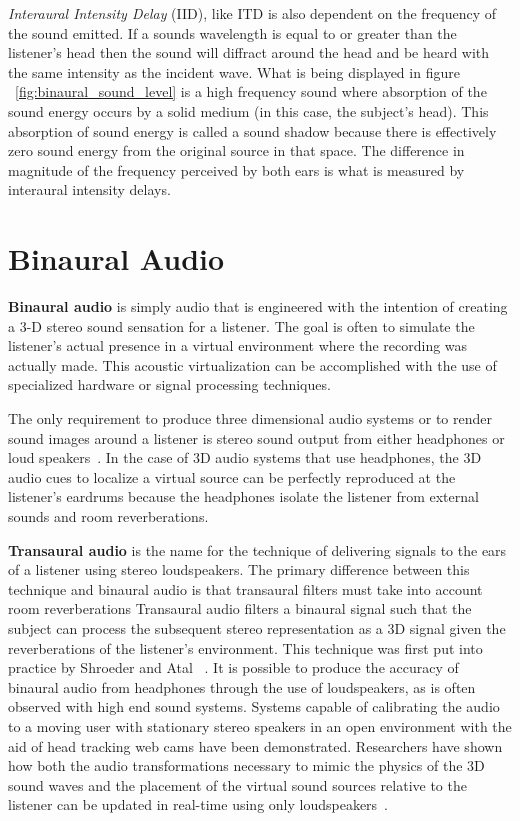 \textit{Interaural Intensity Delay} (IID), like ITD is also dependent on the
frequency of the sound emitted. If a sounds wavelength is equal to or greater
than the listener's head then the sound will diffract around the head and be
heard with the same intensity as the incident wave. What is being displayed in
figure ~\ref{fig:binaural_sound_level} is a high frequency sound where
absorption of the sound energy occurs by a solid medium (in this case, the
subject's head). This absorption of sound energy is called a sound shadow
because there is effectively zero sound energy from the original source in that
space. The difference in magnitude of the frequency perceived by both ears is
what is measured by interaural intensity delays.


\section{                  Binaural Audio                                     }

\textbf{Binaural audio} is simply audio that is engineered with the intention
of creating a 3-D stereo sound sensation for a listener. The goal is often to
simulate the listener's actual presence in a virtual environment where the
recording was actually made. This acoustic virtualization can be accomplished
with the use of specialized hardware or signal processing techniques.

The only requirement to produce three dimensional audio systems or to render
sound images around a listener is stereo sound output from either headphones
or loud speakers~\cite{thackara2005bubble}. In the case of 3D audio systems
that use headphones, the 3D audio cues to localize a virtual source can be
perfectly reproduced at the listener's eardrums because the headphones isolate
the listener from external sounds and room reverberations.

\textbf{Transaural audio} is the name for the technique of delivering signals to
the ears of a listener using stereo loudspeakers. The primary difference between
this technique and binaural audio is that transaural filters must take into
account room reverberations Transaural audio filters a binaural signal such
that the subject can process the subsequent stereo representation as a 3D signal
given the reverberations of the listener's environment. This technique was
first put into practice by Shroeder and Atal ~\cite{ schroeder1963computer,
schroeder1970digital }. It is possible to produce the accuracy of binaural audio
from headphones through the use of loudspeakers, as is often observed with high
end sound systems. Systems capable of calibrating the audio to a moving user
with stationary stereo speakers in an open environment with the aid of head
tracking web cams have been demonstrated. Researchers have shown how both the
audio transformations necessary to mimic the physics of the 3D sound waves and
the placement of the virtual sound sources relative to the listener can be
updated in real-time using only loudspeakers~\cite{song2010personal}.

